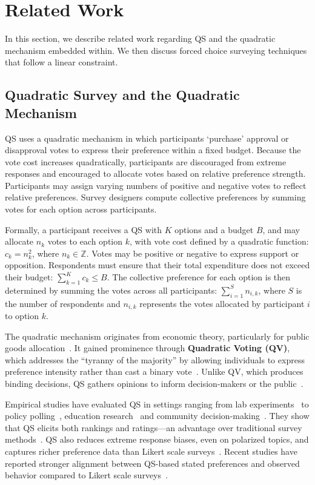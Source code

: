 \section{Related Work}
\label{sec:relatedWorks}
In this section, we describe related work regarding QS and the quadratic mechanism embedded within. We then discuss forced choice surveying techniques that follow a linear constraint.

\subsection{Quadratic Survey and the Quadratic Mechanism}
QS uses a quadratic mechanism in which participants `purchase' approval or disapproval votes to express their preference within a fixed budget. Because the vote cost increases quadratically, participants are discouraged from extreme responses and encouraged to allocate votes based on relative preference strength. Participants may assign varying numbers of positive and negative votes to reflect relative preferences. Survey designers compute collective preferences by summing votes for each option across participants.

Formally, a participant receives a QS with $K$ options and a budget $B$, and may allocate $n_k$ votes to each option $k$, with vote cost defined by a quadratic function: $c_k = n_k^2$, where $n_k \in \mathbb{Z}$. Votes may be positive or negative to express support or opposition. Respondents must ensure that their total expenditure does not exceed their budget: $\sum_{k=1}^{K} c_k \leq B$. The collective preference for each option is then determined by summing the votes across all participants: $\sum_{i=1}^{S} n_{i,k}$, where $S$ is the number of respondents and $n_{i,k}$ represents the votes allocated by participant $i$ to option $k$.

The quadratic mechanism originates from economic theory, particularly for public goods allocation~\cite{grovesOptimalAllocationPublic1977}. It gained prominence through \textbf{Quadratic Voting (QV)}, which addresses the ``tyranny of the majority'' by allowing individuals to express preference intensity rather than cast a binary vote~\cite{posner2018radical}. Unlike QV, which produces binding decisions, QS gathers opinions to inform decision-makers or the public~\cite{cavaille2024cares, chengOrganizeThenVote2025}.

Empirical studies have evaluated QS in settings ranging from lab experiments~\cite{chengCanShowWhat2021, quarfoot2017quadratic} to policy polling~\cite{cavaille2024cares, hollandDistributiveImpactsSupport2022}, education research~\cite{naylor2017first} and community decision-making~\cite{karpinskiPotentialQuadraticVoting2025}. They show that QS elicits both rankings and ratings---an advantage over traditional survey methods~\cite{chengCanShowWhat2021}. QS also reduces extreme response biases, even on polarized topics, and captures richer preference data than Likert scale surveys~\cite{quarfoot2017quadratic, cavaille2024cares, chengCanShowWhat2021, naylor2017first}. Recent studies have reported stronger alignment between QS-based stated preferences and observed behavior compared to Likert scale surveys~\cite{cavaille2024cares, chengCanShowWhat2021}.


